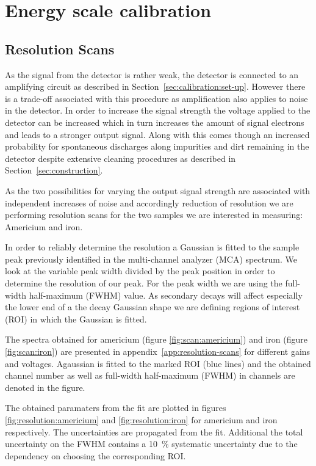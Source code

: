 \section{Energy scale calibration}

\subsection{Resolution Scans}
\label{sec:resolution_scan}
As the signal from the detector is rather weak, the detector is connected to an
amplifying circuit as described in Section~\ref{sec:calibration:set-up}. However
there is a trade-off associated with this procedure as amplification also
applies to noise in the detector. In order to increase the signal strength the
voltage applied to the detector can be increased which in turn increases the
amount of signal electrons and leads to a stronger output signal. Along with
this comes though an increased probability for spontaneous discharges along
impurities and dirt remaining in the detector despite extensive cleaning
procedures as described in Section~\ref{sec:construction}.

As the two possibilities for varying the output signal strength are associated
with independent increases of noise and accordingly reduction of resolution we
are performing resolution scans for the two samples we are interested in
measuring: Americium and iron.

In order to reliably determine the resolution a Gaussian is fitted to the sample
peak previously identified in the multi-channel analyzer (MCA) spectrum. We look
at the variable peak width divided by the peak position in order to determine
the resolution of our peak. For the peak width we are using the full-width
half-maximum (FWHM) value. As secondary decays will affect especially the lower
end of a the decay Gaussian  shape we are defining regions of interest (ROI) in which the Gaussian
is fitted.

The spectra obtained for americium (figure \ref{fig:scan:americium}) and iron
(figure \ref{fig:scan:iron}) are presented in appendix~\ref{app:resolution-scans} for different gains and voltages.
Agaussian is fitted to the marked ROI (blue lines) and the obtained channel number as well as
full-width half-maximum (FWHM) in channels are denoted in the figure.

The obtained paramaters from the fit are plotted in figures
\ref{fig:resolution:americium} and \ref{fig:resolution:iron} for americium and
iron respectively. The uncertainties are propagated from the fit. Additional the
total uncertainty on the FWHM contains a \SI{10}{\percent} systematic
uncertainty due to the dependency on choosing the corresponding ROI.

